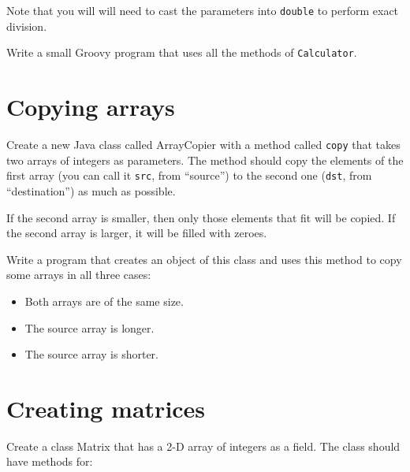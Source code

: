 \documentclass{article}
\begin{document}
Note that you will will need to cast the parameters into \verb+double+
to perform exact division. 

Write a small Groovy program that uses all the methods of
\verb+Calculator+.



\section{Copying arrays}
\label{sec:copying-arrays}

Create a new Java class called ArrayCopier with a method called
\verb+copy+ that takes two arrays of integers as parameters. The
method should copy the elements of the first array (you can call it
\verb+src+, from ``source'') to the second one (\verb+dst+, from
``destination'') as much as possible.

If the second array is smaller, then only those elements that fit will
be copied. If the second array is larger, it will be filled with
zeroes. 

Write a program that creates an object of this class and uses this
method to copy some arrays in all three cases: 

\begin{itemize}
\item Both arrays are of the same size.
\item The source array is longer.
\item The source array is shorter. 
\end{itemize}

\section{Creating matrices}
\label{sec:creating-matrices}

Create a class Matrix that has a 2-D array of integers as a field. The
class should have methods for: 
\end{document}
